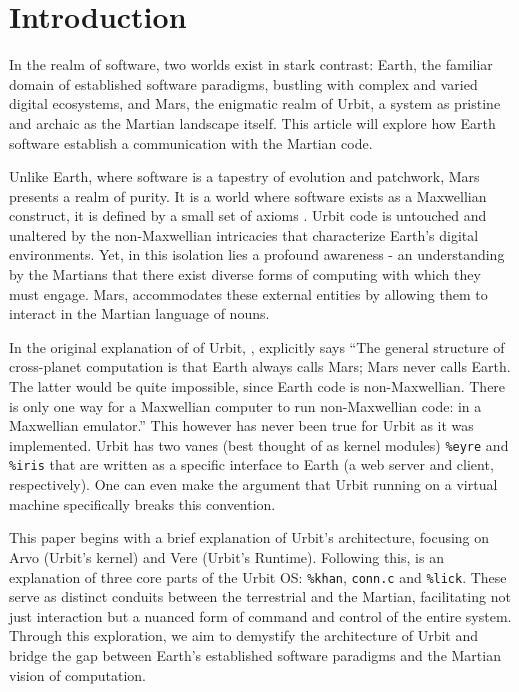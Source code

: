 \documentclass[twoside]{article}
\begin{document}
\setcounter{page}{1}

\tableofcontents

\section{Introduction}

In the realm of software, two worlds exist in stark contrast: 
Earth, the familiar domain of established software paradigms, bustling with complex and varied digital ecosystems, 
and Mars, the enigmatic realm of Urbit, a system as pristine and archaic as the Martian landscape itself. 
This article will explore how Earth software establish a communication with the Martian code.

Unlike Earth, where software is a tapestry of evolution and patchwork, Mars presents a realm of purity. 
It is a world where software exists as a Maxwellian construct, it is defined by a small set of axioms \citep{Nock4k}. Urbit code is untouched and unaltered by the non-Maxwellian intricacies that characterize Earth’s digital environments. 
Yet, in this isolation lies a profound awareness - an understanding by the Martians that there exist diverse forms of computing with which they must engage. 
Mars, accommodates these external entities by allowing them to interact in the Martian language of nouns.

In the original explanation of of Urbit, \citeauthor{Yarvin2010}, explicitly says 
``The general structure of cross-planet computation is that Earth always calls Mars; Mars never calls Earth. The latter would be quite impossible, since Earth code is non-Maxwellian. There is only one way for a Maxwellian computer to run non-Maxwellian code: in a Maxwellian emulator.''
This however has never been true for Urbit as it was implemented. Urbit has two vanes (best thought of as kernel modules) \texttt{\%eyre} and \texttt{\%iris} that are written as a specific interface to Earth (a web server and client, respectively). One can even make the argument that Urbit running on a virtual machine specifically breaks this convention. 

This paper begins with a brief explanation of Urbit's architecture, focusing on Arvo (Urbit's kernel) and Vere (Urbit's Runtime). 
Following this, is an explanation of three core parts of the Urbit OS: 
\texttt{\%khan}, \texttt{conn.c} and \texttt{\%lick}. 
These serve as distinct conduits between the terrestrial and the Martian, facilitating not just interaction but a nuanced form of command and control of the entire system.
Through this exploration, we aim to demystify the architecture of Urbit and bridge the gap between Earth’s established software paradigms and the Martian vision of computation.
\end{document}

